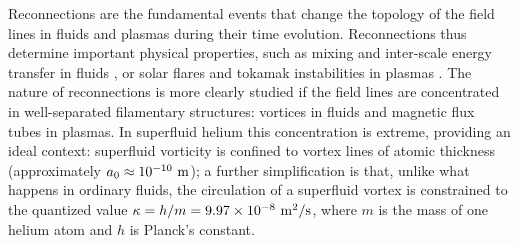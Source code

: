 \documentclass[9pt,twocolumn,twoside]{pnas-new}
\begin{document}
Reconnections are the fundamental events that
change the topology of the field lines in fluids and plasmas during their time evolution. Reconnections thus determine important physical properties, such as mixing and inter-scale energy transfer in fluids \cite{YaoHussainAnnRev2022}, or solar flares and tokamak instabilities in plasmas \cite{Chapman2010}. The nature of reconnections is more clearly studied if the field lines are concentrated in well-separated filamentary structures: vortices in fluids and magnetic flux tubes in plasmas. In superfluid helium this concentration is extreme, providing an ideal context: superfluid vorticity is confined to vortex lines of atomic thickness (approximately $a_0 \approx 10^{-10}~\rm m$); a further simplification 
is that, unlike what happens in ordinary fluids, the
circulation of a superfluid vortex  is constrained to the quantized value $\kappa=h/m=9.97 \times 10^{-8}~\rm m^2/s$, 
where $m$ is the mass of one helium atom and $h$ is Planck's constant. 
\end{document}
